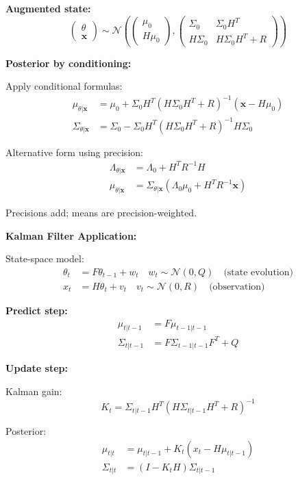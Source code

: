 \documentclass[12pt]{article}
\begin{document}
\begin{explanation}
\textbf{Augmented state:}
\[
\begin{pmatrix} \theta \\ \mathbf{x} \end{pmatrix} \sim \mathcal{N}\left(\begin{pmatrix} \mu_0 \\ H\mu_0 \end{pmatrix}, \begin{pmatrix} \Sigma_0 & \Sigma_0 H^T \\ H\Sigma_0 & H\Sigma_0H^T + R \end{pmatrix}\right)
\]

\textbf{Posterior by conditioning:}

Apply conditional formulas:
\begin{align*}
\mu_{\theta | \mathbf{x}} &= \mu_0 + \Sigma_0 H^T(H\Sigma_0H^T + R)^{-1}(\mathbf{x} - H\mu_0) \\
\Sigma_{\theta | \mathbf{x}} &= \Sigma_0 - \Sigma_0 H^T(H\Sigma_0H^T + R)^{-1}H\Sigma_0
\end{align*}

Alternative form using precision:
\begin{align*}
\Lambda_{\theta | \mathbf{x}} &= \Lambda_0 + H^TR^{-1}H \\
\mu_{\theta | \mathbf{x}} &= \Sigma_{\theta|\mathbf{x}}(\Lambda_0\mu_0 + H^TR^{-1}\mathbf{x})
\end{align*}

Precisions add; means are precision-weighted.

\textbf{Kalman Filter Application:}

State-space model:
\begin{align*}
\theta_t &= F\theta_{t-1} + w_t \quad w_t \sim \mathcal{N}(0, Q) \quad \text{(state evolution)} \\
x_t &= H\theta_t + v_t \quad v_t \sim \mathcal{N}(0, R) \quad \text{(observation)}
\end{align*}

\textbf{Predict step:}
\begin{align*}
\mu_{t|t-1} &= F\mu_{t-1|t-1} \\
\Sigma_{t|t-1} &= F\Sigma_{t-1|t-1}F^T + Q
\end{align*}

\textbf{Update step:}

Kalman gain:
\[
K_t = \Sigma_{t|t-1}H^T(H\Sigma_{t|t-1}H^T + R)^{-1}
\]

Posterior:
\begin{align*}
\mu_{t|t} &= \mu_{t|t-1} + K_t(x_t - H\mu_{t|t-1}) \\
\Sigma_{t|t} &= (I - K_tH)\Sigma_{t|t-1}
\end{align*}


\end{explanation}
\end{document}
